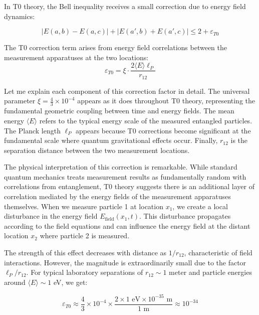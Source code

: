 \documentclass[12pt,a4paper]{article}
\newcommand{\xipar}{\xi}
\theoremstyle{definition}
\theoremstyle{remark}
\begin{document}
	In T0 theory, the Bell inequality receives a small correction due to energy field dynamics:
	
	\begin{equation}
		\boxed{|E(a,b) - E(a,c)| + |E(a',b) + E(a',c)| \leq 2 + \varepsilon_{T0}}
		\label{eq:modified_bell}
	\end{equation}
	
	The T0 correction term arises from energy field correlations between the measurement apparatuses at the two locations:
	\begin{equation}
		\varepsilon_{T0} = \xipar \cdot \frac{2\langle E \rangle \ell_P}{r_{12}}
		\label{eq:t0_bell_correction}
	\end{equation}
	
	Let me explain each component of this correction factor in detail. The universal parameter $\xipar = \frac{4}{3} \times 10^{-4}$ appears as it does throughout T0 theory, representing the fundamental geometric coupling between time and energy fields. The mean energy $\langle E \rangle$ refers to the typical energy scale of the measured entangled particles. The Planck length $\ell_P$ appears because T0 corrections become significant at the fundamental scale where quantum gravitational effects occur. Finally, $r_{12}$ is the separation distance between the two measurement locations.
	
	The physical interpretation of this correction is remarkable. While standard quantum mechanics treats measurement results as fundamentally random with correlations from entanglement, T0 theory suggests there is an additional layer of correlation mediated by the energy fields of the measurement apparatuses themselves. When we measure particle 1 at location $x_1$, we create a local disturbance in the energy field $E_{\text{field}}(x_1, t)$. This disturbance propagates according to the field equations and can influence the energy field at the distant location $x_2$ where particle 2 is measured.
	
	The strength of this effect decreases with distance as $1/r_{12}$, characteristic of field interactions. However, the magnitude is extraordinarily small due to the factor $\ell_P/r_{12}$. For typical laboratory separations of $r_{12} \sim 1$ meter and particle energies around $\langle E \rangle \sim 1$ eV, we get:
	
	\begin{equation}
		\varepsilon_{T0} \approx \frac{4}{3} \times 10^{-4} \times \frac{2 \times 1 \text{ eV} \times 10^{-35} \text{ m}}{1 \text{ m}} \approx 10^{-34}
	\end{equation}
	
\end{document}
